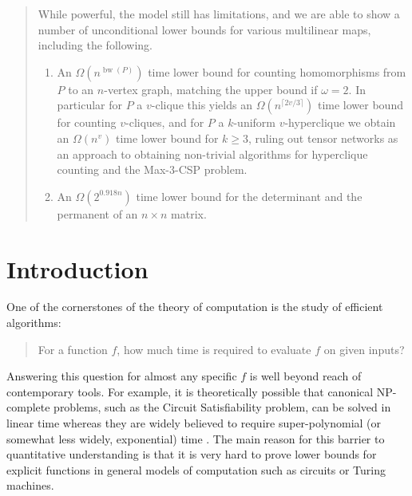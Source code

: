 \documentclass{toc}
\DeclareMathOperator{\bw}{bw}
\begin{document}
\begin{frontmatter}
\begin{abstract}
  While powerful, the model still has limitations, and we are able to
  show a number of unconditional lower bounds for various multilinear maps,
  including the following.  %
  \begin{enumerate}
  \item[(a)] %
  An  %
$\Omega(n^{\bw(P)})$ time lower bound for counting homomorphisms from $P$ to an $n$-vertex graph, matching the upper bound if $\omega = 2$.
    In particular for $P$ a $v$-clique this yields an $\Omega(n^{\lceil 2v/3 \rceil})$ time lower bound for counting $v$-cliques, and for $P$ a $k$-uniform $v$-hyperclique we obtain an $\Omega(n^v)$ time lower bound for $k \ge 3$, ruling out tensor networks as an approach to obtaining non-trivial algorithms for hyperclique counting and the Max-$3$-CSP problem.

  \item[(b)] %
   An  %
$\Omega(2^{0.918n})$ time lower bound for the
    determinant and the %
    permanent of an $n \times n$ matrix.

  \end{enumerate}
\end{abstract}

%

\end{frontmatter}

%
%
%

\section{Introduction}

\noindent
One of the cornerstones of the theory of computation is the study of efficient
algorithms:
\begin{quote}
For a function $f$, how much time is required to evaluate $f$ on given inputs?
\end{quote}
Answering this question for almost any specific $f$ is well beyond
reach of contemporary tools. For example, it is theoretically possible
that canonical NP-complete problems,
such as the Circuit Satisfiability problem, can be solved in linear
time whereas they are widely believed to require super-polynomial
(or somewhat less widely, exponential) time \cite{Gasarch2012,Impagliazzo2001,Impagliazzo2001b}.
The main reason for this barrier to quantitative understanding is that it is
very hard to prove lower bounds for explicit functions in general models
of computation such as circuits or Turing machines.
\end{document}

